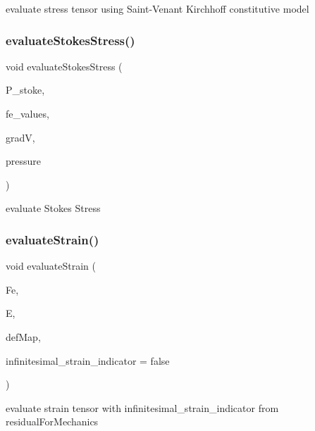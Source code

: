 evaluate stress tensor using Saint-\/\+Venant Kirchhoff constitutive model \mbox{\label{class_residual_a7e33928364e99df9a42db58752aca7f3}} 
\subsubsection{\texorpdfstring{evaluateStokesStress()}{evaluateStokesStress()}}
{\footnotesize\ttfamily void evaluate\+Stokes\+Stress (\begin{DoxyParamCaption}\item[{dealii\+::\+Table$<$ 3, T $>$}]{P\+\_\+stoke,  }\item[{const F\+E\+Values$<$ dim $>$ \&}]{fe\+\_\+values,  }\item[{Table$<$ 3, T $>$ \&}]{gradV,  }\item[{dealii\+::\+Table$<$ 1, T $>$ \&}]{pressure }\end{DoxyParamCaption})}

evaluate Stokes Stress \mbox{\label{class_residual_a4b181b84ebad5e2adb629b4a542dc9c6}} 
\subsubsection{\texorpdfstring{evaluateStrain()}{evaluateStrain()}}
{\footnotesize\ttfamily void evaluate\+Strain (\begin{DoxyParamCaption}\item[{dealii\+::\+Table$<$ 3, T $>$ \&}]{Fe,  }\item[{dealii\+::\+Table$<$ 3, T $>$ \&}]{E,  }\item[{\mbox{\hyperlink{structdeformation_map}{deformation\+Map}}$<$ T, dim $>$ \&}]{def\+Map,  }\item[{bool}]{infinitesimal\+\_\+strain\+\_\+indicator = {\ttfamily false} }\end{DoxyParamCaption})}

evaluate strain tensor with infinitesimal\+\_\+strain\+\_\+indicator from residual\+For\+Mechanics \mbox{\label{class_residual_a882f4595a6547599cfe8f65897f45896}} 
